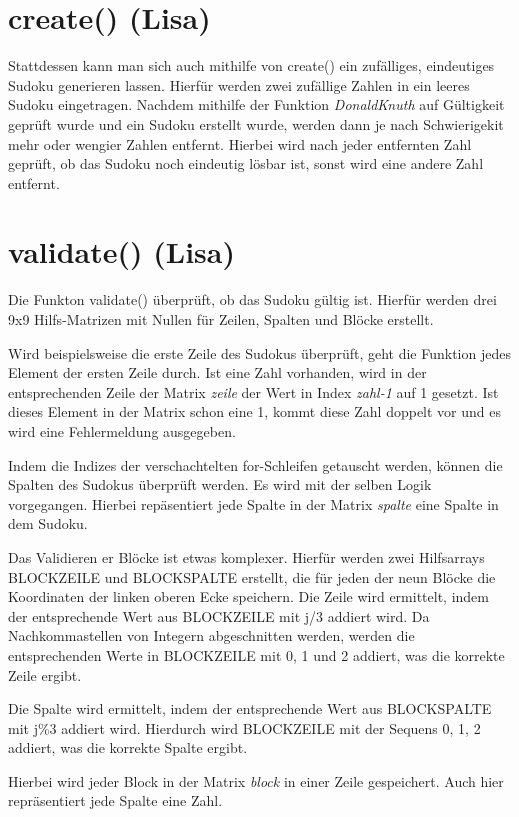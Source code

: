 \documentclass[a4paper,10pt]{article}
\begin{document}
\section{create() (Lisa)}

Stattdessen kann man sich auch mithilfe von create() ein zufälliges, eindeutiges Sudoku generieren lassen. Hierfür werden zwei zufällige Zahlen in ein leeres Sudoku eingetragen. Nachdem mithilfe der Funktion \textit{DonaldKnuth} auf Gültigkeit geprüft wurde und ein Sudoku erstellt wurde, werden dann je nach Schwierigekit mehr oder wengier Zahlen entfernt. Hierbei wird nach jeder entfernten Zahl geprüft, ob das Sudoku noch eindeutig lösbar ist, sonst wird eine andere Zahl entfernt.

\section{validate() (Lisa)}

Die Funkton validate() überprüft, ob das Sudoku gültig ist. Hierfür werden drei 9x9 Hilfs-Matrizen mit Nullen für Zeilen, Spalten und Blöcke erstellt.

Wird beispielsweise die erste Zeile des Sudokus überprüft, geht die Funktion jedes Element der ersten Zeile durch. Ist eine Zahl vorhanden, wird in der entsprechenden Zeile der Matrix \textit{zeile} der Wert in Index \textit{zahl-1} auf 1 gesetzt. Ist dieses Element in der Matrix schon eine 1, kommt diese Zahl doppelt vor und es wird eine Fehlermeldung ausgegeben.

Indem die Indizes der verschachtelten for-Schleifen getauscht werden, können die Spalten des Sudokus überprüft werden. Es wird mit der selben Logik vorgegangen. Hierbei repäsentiert jede Spalte in der Matrix \textit{spalte} eine Spalte in dem Sudoku.

Das Validieren er Blöcke ist etwas komplexer. Hierfür werden zwei Hilfsarrays BLOCKZEILE und BLOCKSPALTE erstellt, die für jeden der neun Blöcke die Koordinaten der linken oberen Ecke speichern. Die Zeile wird ermittelt, indem der entsprechende Wert aus BLOCKZEILE mit j/3 addiert wird. Da Nachkommastellen von Integern abgeschnitten werden, werden die entsprechenden Werte in BLOCKZEILE mit 0, 1 und 2 addiert, was die korrekte Zeile ergibt.

Die Spalte wird ermittelt, indem der entsprechende Wert aus BLOCKSPALTE mit j\%3 addiert wird. Hierdurch wird BLOCKZEILE mit der Sequens 0, 1, 2 addiert, was die korrekte Spalte ergibt.

Hierbei wird jeder Block in der Matrix \textit{block} in einer Zeile gespeichert. Auch hier repräsentiert jede Spalte eine Zahl.
\end{document}
